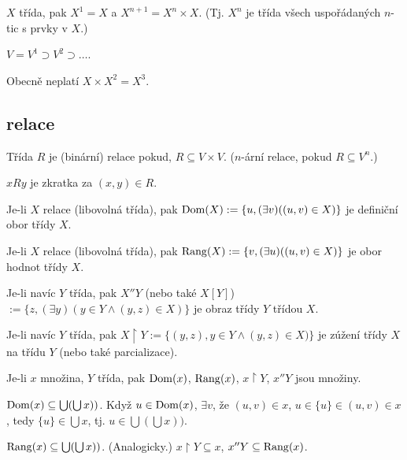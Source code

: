 \documentclass[12pt]{article}                   %
\begin{document}
        \begin{definice}[Mocnina]
            $X$ třída, pak $X^1 = X$ a $X^{n+1} = X^n\times X$. (Tj. $X^n$ je třída všech uspořádaných $n$-tic s prvky v $X$.)
        \end{definice}

        \begin{pozorovani}
            $V = V^1 \supset V^2 \supset …$.
        \end{pozorovani}

        \begin{priklad}
            Obecně neplatí $X \times X^2 = X^3$.
        \end{priklad}

    \subsection{relace}
        \begin{definice}[Relace]
            Třída $R$ je (binární) relace pokud, $R \subseteq V \times V$. ($n$-ární relace, pokud $R \subseteq V^n$.)

            $xRy$ je zkratka za $(x, y) \in R$.
        \end{definice}

        \begin{definice}
            Je-li $X$ relace (libovolná třída), pak $\operatorname{Dom}(X) := \{u, (\exists v)((u, v) \in X)\}$ je definiční obor třídy $X$.

            Je-li $X$ relace (libovolná třída), pak $\operatorname{Rang}(X) := \{v, (\exists u)((u, v) \in X)\}$ je obor hodnot třídy $X$.

            Je-li navíc $Y$ třída, pak $X''Y$ (nebo také $X[Y]$) $:= \{z, (\exists y)(y \in Y \land (y, z) \in X)\}$ je obraz třídy $Y$ třídou $X$.

            Je-li navíc $Y$ třída, pak $X\upharpoonright Y := \{(y, z), y \in Y \land (y, z) \in X)\}$ je zúžení třídy $X$ na třídu $Y$ (nebo také parcializace).
        \end{definice}
       
        \begin{lemma}
            Je-li $x$ množina, $Y$ třída, pak $\operatorname{Dom}(x)$, $\operatorname{Rang}(x)$, $x \upharpoonright Y$, $x''Y$ jsou množiny.

            \begin{dukazin}
                $\operatorname{Dom}(x) \subseteq \bigcup(\bigcup x))$. Když $u \in \operatorname{Dom}(x)$, $\exists v$, že $(u, v) \in x$, $u \in \{u\} \in (u, v) \in x$, tedy $\{u\} \in \bigcup x$, tj. $u \in \bigcup(\bigcup x))$.

                $\operatorname{Rang}(x) \subseteq \bigcup(\bigcup x))$. (Analogicky.) $x \upharpoonright Y \subseteq x$, $x''Y \subseteq \operatorname{Rang}(x)$.
            \end{dukazin}
        \end{lemma}
\end{document}
